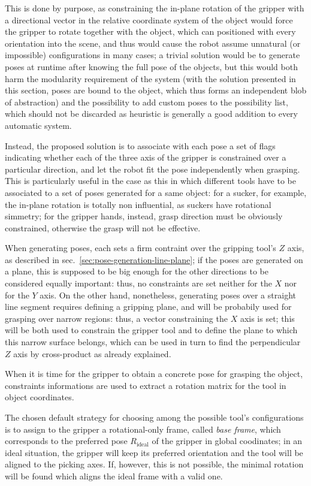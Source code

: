 This is done by purpose, as constraining the in-plane rotation of the
gripper with a directional vector in the relative coordinate system of
the object would force the gripper to rotate together with the object,
which can positioned with every orientation into the scene, and thus
would cause the robot assume unnatural (or impossible) configurations
in many cases; a trivial solution would be to generate poses at
runtime after knowing the full pose of the objects, but this would
both harm the modularity requirement of the system (with the solution
presented in this section, poses are bound to the object, which thus
forms an independent blob of abstraction) and the possibility to add
custom poses to the possibility list, which should not be discarded as
heuristic is generally a good addition to every automatic system.

Instead, the proposed solution is to associate with each pose a set of
flags indicating whether each of the three axis of the gripper is
constrained over a particular direction, and let the robot fit the
pose independently when grasping. This is particularly useful in the
case as this in which different tools have to be associated to a set
of poses generated for a same object: for a sucker, for example, the
in-plane rotation is totally non influential, as suckers have
rotational simmetry; for the gripper hands, instead, grasp direction
must be obviously constrained, otherwise the grasp will not be effective.

When generating poses, each sets a firm contraint over the gripping
tool's $Z$ axis, as described in
sec.~\ref{sec:pose-generation-line-plane}; if the poses are generated
on a plane, this is supposed to be big enough for the other directions
to be considered equally important: thus, no constraints are set
neither for the $X$ nor for the $Y$ axis. On the other hand,
nonetheless, generating poses over a straight line segment requires
defining a gripping plane, and will be probabily used for grasping
over narrow regions: thus, a vector constraining the $X$ axis is set;
this will be both used to constrain the gripper tool and to define the
plane to which this narrow surface belongs, which can be used in turn
to find the perpendicular $Z$ axis by cross-product as already explained.

When it is time for the gripper to obtain a concrete pose for grasping
the object, constraints informations are used to extract a rotation
matrix for the tool in object coordinates.

The chosen default strategy for choosing among the possible tool's
configurations is to assign to the gripper a rotational-only frame, called \emph{base
  frame}, which corresponds to the preferred pose $R_{\text{ideal}}$ of the gripper in
global coodinates; in an ideal situation, the gripper will keep its
preferred orientation and the tool will be aligned to the picking
axes. If, however, this is not possible, the minimal rotation will be
found which aligns the ideal frame with a valid one.

